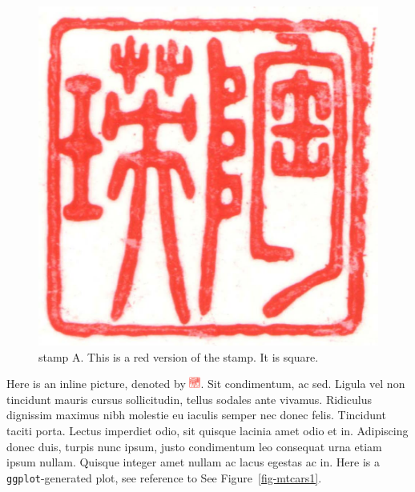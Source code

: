 \documentclass[
  11pt,
  letterpaper,
  DIV=11,
  numbers=noendperiod]{scrartcl}
\begin{document}
\begin{figure}

{\centering \includegraphics{stamp1a.jpg}

}

\caption{\label{fig-stamp1}stamp A. This is a red version of the stamp.
It is square.}

\end{figure}

Here is an inline picture, denoted by
\includegraphics[width=\textwidth,height=1em]{stamp1a.jpg}. Sit
condimentum, ac sed. Ligula vel non tincidunt mauris cursus
sollicitudin, tellus sodales ante vivamus. Ridiculus dignissim maximus
nibh molestie eu iaculis semper nec donec felis. Tincidunt taciti porta.
Lectus imperdiet odio, sit quisque lacinia amet odio et in. Adipiscing
donec duis, turpis nunc ipsum, justo condimentum leo consequat urna
etiam ipsum nullam. Quisque integer amet nullam ac lacus egestas ac in.
Here is a \texttt{ggplot}-generated plot, see reference to See
Figure~\ref{fig-mtcars1}.
\end{document}
